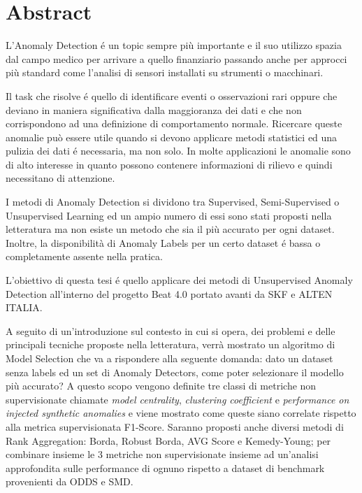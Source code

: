 \chapter*{Abstract}
L’Anomaly Detection é un topic sempre più importante e il suo utilizzo spazia dal campo medico per arrivare a quello finanziario passando anche per approcci più standard come l'analisi di sensori installati su strumenti o macchinari.

Il task che risolve é quello di identificare eventi o osservazioni rari oppure che deviano in maniera significativa dalla maggioranza dei dati e che non corrispondono ad una definizione di comportamento normale. Ricercare queste anomalie può essere utile quando si devono applicare metodi statistici ed una pulizia dei dati é necessaria, ma non solo. In molte applicazioni le anomalie sono di alto interesse in quanto possono contenere informazioni di rilievo e quindi necessitano di attenzione. 

I metodi di Anomaly Detection si dividono tra Supervised, Semi-Supervised o Unsupervised Learning ed un ampio numero di essi sono stati proposti nella letteratura ma non esiste un metodo che sia il più accurato per ogni dataset. Inoltre, la disponibilità di Anomaly Labels per un certo dataset é bassa o completamente assente nella pratica. 


L’obiettivo di questa tesi é quello applicare dei metodi di Unsupervised Anomaly Detection all'interno del progetto Beat 4.0 portato avanti da SKF e ALTEN ITALIA. 

A seguito di un'introduzione sul contesto in cui si opera, dei problemi e delle principali tecniche proposte nella letteratura, verrà mostrato un algoritmo di Model Selection che va a rispondere alla seguente domanda: dato un dataset senza labels ed un set di Anomaly Detectors, come poter selezionare il modello più accurato? A questo scopo vengono definite tre classi di metriche non supervisionate chiamate \textit{model centrality}, \textit{clustering coefficient} e \textit{performance on injected synthetic anomalies} e viene mostrato come queste siano correlate rispetto alla metrica supervisionata F1-Score. Saranno proposti anche diversi metodi di Rank Aggregation: Borda, Robust Borda, AVG Score e Kemedy-Young; per combinare insieme le 3 metriche non supervisionate insieme ad un'analisi approfondita sulle performance di ognuno rispetto a dataset di benchmark provenienti da ODDS e SMD.

